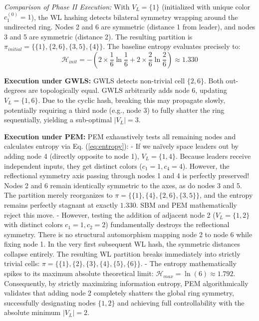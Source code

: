 \documentclass{IEEEtran}
\begin{document}
	\textit{Comparison of Phase II Execution:}
	With $V_L = \{1\}$ (initialized with unique color $c_1^{(0)}=1$), the WL hashing detects bilateral symmetry wrapping around the undirected ring. Nodes 2 and 6 are symmetric (distance 1 from leader), and nodes 3 and 5 are symmetric (distance 2). The resulting partition is $\pi_{initial} = \{\{1\}, \{2,6\}, \{3,5\}, \{4\}\}$. 
	The baseline entropy evaluates precisely to:
	\begin{equation}
		\mathcal{H}_{init} = - \left(2 \times \frac{1}{6}\ln\frac{1}{6} + 2 \times \frac{2}{6}\ln\frac{2}{6} \right) \approx 1.330
	\end{equation}
	
	\textbf{Execution under GWLS:} 
	GWLS detects non-trivial cell $\{2,6\}$. Both out-degrees are topologically equal. GWLS arbitrarily adds node 6, updating $V_L = \{1,6\}$. Due to the cyclic hash, breaking this may propagate slowly, potentially requiring a third node (e.g., node 3) to fully shatter the ring sequentially, yielding a sub-optimal $|V_L|=3$.
	
	\textbf{Execution under PEM:}
	PEM exhaustively tests all remaining nodes and calculates entropy via Eq. (\ref{eq:entropy}):
	- If we naïvely space leaders out by adding node 4 (directly opposite to node 1), $V_L = \{1, 4\}$. Because leaders receive independent inputs, they get distinct colors ($c_1=1, c_4=4$). However, the reflectional symmetry axis passing through nodes 1 and 4 is perfectly preserved! Nodes 2 and 6 remain identically symmetric to the axes, as do nodes 3 and 5. The partition merely reorganizes to $\pi = \{\{1\}, \{4\}, \{2,6\}, \{3,5\}\}$, and the entropy remains perfectly stagnant at exactly $1.330$. SBM and PEM mathematically reject this move.
	- However, testing the addition of adjacent node 2 ($V_L=\{1,2\}$ with distinct colors $c_1=1, c_2=2$) fundamentally destroys the reflectional symmetry. There is no structural automorphism mapping node 2 to node 6 while fixing node 1. In the very first subsequent WL hash, the symmetric distances collapse entirely. The resulting WL partition breaks immediately into strictly trivial cells: $\pi = \{\{1\}, \{2\}, \{3\}, \{4\}, \{5\}, \{6\}\}$.
	- The entropy mathematically spikes to its maximum absolute theoretical limit: $\mathcal{H}_{max} = \ln(6) \approx 1.792$. 
	Consequently, by strictly maximizing information entropy, PEM algorithmically validates that adding node 2 completely shatters the global ring symmetry, successfully designating nodes $\{1, 2\}$ and achieving full controllability with the absolute minimum $|V_L|=2$.
	
\end{document}
